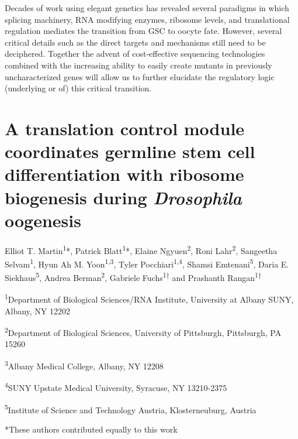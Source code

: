 \documentclass[12pt,oneside]{reedthesis}
\begin{document}
Decades of work using elegant genetics has revealed several paradigms in
which splicing machinery, RNA modifying enzymes, ribosome levels, and
translational regulation mediates the transition from GSC to oocyte
fate. However, several critical details such as the direct targets and
mechanisms still need to be deciphered. Together the advent of
cost-effective sequencing technologies combined with the increasing
ability to easily create mutants in previously uncharacterized genes
will allow us to further elucidate the regulatory logic (underlying or
of) this critical transition.



\hypertarget{a-translation-control-module-coordinates-germline-stem-cell-differentiation-with-ribosome-biogenesis-during-drosophila-oogenesis}{%
\chapter{\texorpdfstring{A translation control module coordinates germline stem cell differentiation with ribosome biogenesis during \emph{Drosophila} oogenesis}{A translation control module coordinates germline stem cell differentiation with ribosome biogenesis during Drosophila oogenesis}}\label{a-translation-control-module-coordinates-germline-stem-cell-differentiation-with-ribosome-biogenesis-during-drosophila-oogenesis}}

Elliot T. Martin\textsuperscript{1}*, Patrick Blatt\textsuperscript{1}*, Elaine Ngyuen\textsuperscript{2}, Roni
Lahr\textsuperscript{2}, Sangeetha Selvam\textsuperscript{1}, Hyun Ah M. Yoon\textsuperscript{1,3}, Tyler
Pocchiari\textsuperscript{1,4}, Shamsi Emtenani\textsuperscript{5}, Daria E. Siekhaus\textsuperscript{5}, Andrea
Berman\textsuperscript{2}, Gabriele Fuchs\textsuperscript{1†} and Prashanth Rangan\textsuperscript{1†}

\textsuperscript{1}Department of Biological Sciences/RNA Institute, University at Albany
SUNY, Albany, NY 12202

\textsuperscript{2}Department of Biological Sciences, University of Pittsburgh,
Pittsburgh, PA 15260

\textsuperscript{3}Albany Medical College, Albany, NY 12208

\textsuperscript{4}SUNY Upstate Medical University, Syracuse, NY 13210-2375

\textsuperscript{5}Institute of Science and Technology Austria, Klosterneuburg, Austria

*These authors contributed equally to this work
\end{document}

